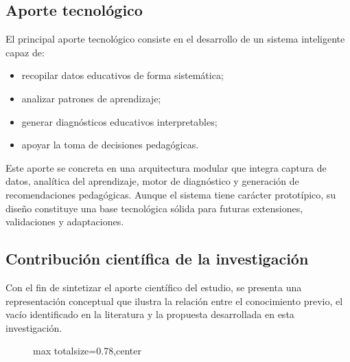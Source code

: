 \begin{refsection}
\subsection{Aporte tecnológico}

El principal aporte tecnológico consiste en el desarrollo de un sistema inteligente capaz de:

\begin{itemize}
\item recopilar datos educativos de forma sistemática;
\item analizar patrones de aprendizaje;
\item generar diagnósticos educativos interpretables;
\item apoyar la toma de decisiones pedagógicas.
\end{itemize}

Este aporte se concreta en una arquitectura modular que integra captura de datos, analítica del aprendizaje, motor de diagnóstico y generación de recomendaciones pedagógicas. Aunque el sistema tiene carácter prototípico, su diseño constituye una base tecnológica sólida para futuras extensiones, validaciones y adaptaciones.

\subsection{Contribución científica de la investigación}

Con el fin de sintetizar el aporte científico del estudio, se presenta una representación conceptual que ilustra la relación entre el conocimiento previo, el vacío identificado en la literatura y la propuesta desarrollada en esta investigación.

\begin{figure}[htbp]
\centering
\begin{adjustbox}{max totalsize={\textwidth}{0.78\textheight},center}
\end{adjustbox}
\end{figure}
\end{refsection}
